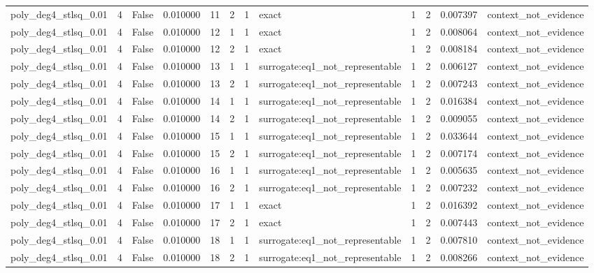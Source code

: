 \begin{tabular}{lrrrrrrlrrrl}
poly\_deg4\_stlsq\_0.01 & 4 & False & 0.010000 & 11 & 2 & 1 & exact & 1 & 2 & 0.007397 & context\_not\_evidence \\
poly\_deg4\_stlsq\_0.01 & 4 & False & 0.010000 & 12 & 1 & 1 & exact & 1 & 2 & 0.008064 & context\_not\_evidence \\
poly\_deg4\_stlsq\_0.01 & 4 & False & 0.010000 & 12 & 2 & 1 & exact & 1 & 2 & 0.008184 & context\_not\_evidence \\
poly\_deg4\_stlsq\_0.01 & 4 & False & 0.010000 & 13 & 1 & 1 & surrogate:eq1\_not\_representable & 1 & 2 & 0.006127 & context\_not\_evidence \\
poly\_deg4\_stlsq\_0.01 & 4 & False & 0.010000 & 13 & 2 & 1 & surrogate:eq1\_not\_representable & 1 & 2 & 0.007243 & context\_not\_evidence \\
poly\_deg4\_stlsq\_0.01 & 4 & False & 0.010000 & 14 & 1 & 1 & surrogate:eq1\_not\_representable & 1 & 2 & 0.016384 & context\_not\_evidence \\
poly\_deg4\_stlsq\_0.01 & 4 & False & 0.010000 & 14 & 2 & 1 & surrogate:eq1\_not\_representable & 1 & 2 & 0.009055 & context\_not\_evidence \\
poly\_deg4\_stlsq\_0.01 & 4 & False & 0.010000 & 15 & 1 & 1 & surrogate:eq1\_not\_representable & 1 & 2 & 0.033644 & context\_not\_evidence \\
poly\_deg4\_stlsq\_0.01 & 4 & False & 0.010000 & 15 & 2 & 1 & surrogate:eq1\_not\_representable & 1 & 2 & 0.007174 & context\_not\_evidence \\
poly\_deg4\_stlsq\_0.01 & 4 & False & 0.010000 & 16 & 1 & 1 & surrogate:eq1\_not\_representable & 1 & 2 & 0.005635 & context\_not\_evidence \\
poly\_deg4\_stlsq\_0.01 & 4 & False & 0.010000 & 16 & 2 & 1 & surrogate:eq1\_not\_representable & 1 & 2 & 0.007232 & context\_not\_evidence \\
poly\_deg4\_stlsq\_0.01 & 4 & False & 0.010000 & 17 & 1 & 1 & exact & 1 & 2 & 0.016392 & context\_not\_evidence \\
poly\_deg4\_stlsq\_0.01 & 4 & False & 0.010000 & 17 & 2 & 1 & exact & 1 & 2 & 0.007443 & context\_not\_evidence \\
poly\_deg4\_stlsq\_0.01 & 4 & False & 0.010000 & 18 & 1 & 1 & surrogate:eq1\_not\_representable & 1 & 2 & 0.007810 & context\_not\_evidence \\
poly\_deg4\_stlsq\_0.01 & 4 & False & 0.010000 & 18 & 2 & 1 & surrogate:eq1\_not\_representable & 1 & 2 & 0.008266 & context\_not\_evidence \\

\end{tabular}
